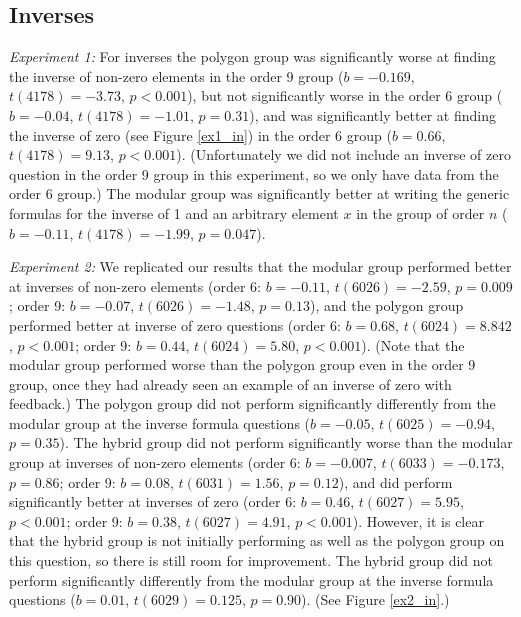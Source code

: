 \documentclass[man,10pt]{apa6}
\begin{document}
\subsection{Inverses}
\textit{Experiment 1:} For inverses the polygon group was significantly worse at finding the inverse of non-zero elements in the order 9 group ($b = -0.169$, $t(4178)=-3.73$, $p < 0.001$), but not significantly worse in the order 6 group ($b = -0.04$, $t(4178)=-1.01$, $p =0.31$), and was significantly better at finding the inverse of zero (see Figure \ref{ex1_in}) in the order 6 group ($b = 0.66$, $t(4178)=9.13$, $p < 0.001$). (Unfortunately we did not include an inverse of zero question in the order 9 group in this experiment, so we only have data from the order 6 group.) The modular group was significantly better at writing the generic formulas for the inverse of 1 and an arbitrary element $x$ in the group of order $n$ ($b = -0.11$, $t(4178)=-1.99$, $p = 0.047$). \par
\textit{Experiment 2:}  We replicated our results that the modular group performed better at inverses of non-zero elements (order 6: $b = -0.11$, $t(6026) = -2.59$, $p = 0.009$; order 9: $b = -0.07$, $t(6026) = -1.48$, $p = 0.13$), and the polygon group performed better at inverse of zero questions (order 6: $b = 0.68$, $t(6024) = 8.842$, $p < 0.001$; order 9: $b = 0.44$, $t(6024) = 5.80$, $p < 0.001$). (Note that the modular group performed worse than the polygon group even in the order 9 group, once they had already seen an example of an inverse of zero with feedback.) The polygon group did not perform significantly differently from the modular group at the inverse formula questions ($b = -0.05$, $t(6025)=-0.94$, $p = 0.35$). The hybrid group did not perform significantly worse than the modular group at inverses of non-zero elements (order 6: $b = -0.007$, $t(6033) = -0.173$, $p = 0.86$; order 9: $b = 0.08$, $t(6031) = 1.56$, $p = 0.12$), and did perform significantly better at inverses of zero (order 6: $b = 0.46$, $t(6027) = 5.95$, $p < 0.001$; order 9: $b = 0.38$, $t(6027) = 4.91$, $p < 0.001$). However, it is clear that the hybrid group is not initially performing as well as the polygon group on this question, so there is still room for improvement. The hybrid group did not perform significantly differently from the modular group at the inverse formula questions ($b = 0.01$, $t(6029)=0.125$, $p =0.90$). (See Figure \ref{ex2_in}.) \par 
\end{document}
